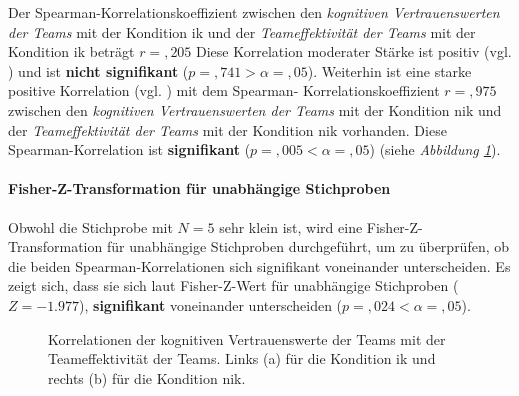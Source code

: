 \documentclass[a4paper,11pt]{article}%
\renewcommand{\\}{\vspace*{0.5\baselineskip} \newline}
\begin{document}
{Der Spearman-Korrelationskoeffizient zwischen den \textit{kognitiven Vertrauenswerten der Teams} mit der Kondition \ac{ik} und der \textit{Teameffektivität der Teams} mit der Kondition \ac{ik} beträgt $r =,205$ Diese Korrelation moderater Stärke ist positiv (vgl. \citep{cohen2013statistical}) und ist \textbf{nicht signifikant} ($p =,741 > \alpha = ,05$). \\
Weiterhin ist eine starke positive Korrelation (vgl. \citep{cohen2013statistical}) mit dem Spearman- Korrelationskoeffizient $r =,975$ zwischen den \textit{kognitiven Vertrauenswerten der Teams} mit der Kondition \newline \ac{nik} und der \textit{Teameffektivität der Teams} mit der Kondition \ac{nik} vorhanden. Diese Spearman-Korrelation ist \textbf{signifikant} ($p =,005 < \alpha = ,05$) (siehe \textit{Abbildung \ref{H3_Korrelation_Auswertung}}).

\paragraph{Fisher-Z-Transformation für unabhängige Stichproben}
Obwohl die Stichprobe mit $N=5$ sehr klein ist, wird eine Fisher-Z-Transformation für unabhängige Stichproben durchgeführt, um zu überprüfen, ob die beiden Spearman-Korrelationen sich signifikant voneinander unterscheiden.
Es zeigt sich, dass sie sich laut Fisher-Z-Wert für unabhängige Stichproben ($Z=-1.977$), \textbf{signifikant} voneinander unterscheiden ($p =,024 < \alpha = ,05$).

\begin{figure}[h]
  \centering
  \qquad
  \caption[Korrelationen der kognitiven Vertrauenswerte der Teams mit der Teameffektivität der Teams]{Korrelationen der kognitiven Vertrauenswerte der Teams mit der Teameffektivität der Teams. Links (a) für die Kondition \ac{ik} und rechts (b) für die Kondition \ac{nik}.}
  \label{H3_Korrelation_Auswertung}
\end{figure}

}
\end{document}
